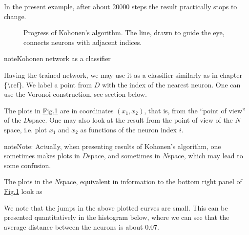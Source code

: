 \documentclass[letterpaper,10pt,english]{jupyterBook}
\let\sphinxpxdimen\pdfpxdimen\else\newdimen\sphinxpxdimen
\begin{document}
\sphinxAtStartPar
In the present example, after about 20000 steps the result practically stops to change.

\begin{figure}[htbp]
\centering
\capstart

\noindent\sphinxincludegraphics[width=800\sphinxpxdimen]{{kaall}.png}
\caption{Progress of Kohonen’s algorithm. The line, drawn to guide the eye, connects neurons with adjacent indices.}\label{\detokenize{docs/som:kohstory-fig}}\end{figure}

\begin{sphinxadmonition}{note}{Kohonen network as a classifier}

\sphinxAtStartPar
Having the trained network, we may use it as a classifier similarly as in chapter \{\textbackslash{}ref\}. We label a point from \(D\) with the index of the nearest neuron. One can use the Voronoi construction, see section {\hyperref[\detokenize{docs/unsupervised:vor-lab}]{}} below.
\end{sphinxadmonition}

\sphinxAtStartPar
The plots in \hyperref[\detokenize{docs/som:kohstory-fig}]{Fig.\@ \ref{\detokenize{docs/som:kohstory-fig}}} are in coordinates \((x_1,x_2)\), that is, from the “point of view” of the \(D\)\sphinxhyphen{}space. One may also look at the result from the point of view of the \(N\)\sphinxhyphen{}space, i.e. plot \(x_1\) and \(x_2\) as functions of the neuron index \(i\).

\begin{sphinxadmonition}{note}{Note:}
\sphinxAtStartPar
Actually, when presenting results of Kohonen’s algorithm, one sometimes makes plots in \(D\)\sphinxhyphen{}space, and sometimes in \(N\)\sphinxhyphen{}space, which may lead to some confusion.
\end{sphinxadmonition}

\sphinxAtStartPar
The plots in the \(N\)\sphinxhyphen{}space, equivalent in information to the bottom right panel of \hyperref[\detokenize{docs/som:kohstory-fig}]{Fig.\@ \ref{\detokenize{docs/som:kohstory-fig}}} look as

\noindent{}

\sphinxAtStartPar
We note that the jumps in the above plotted curves are small. This can be presented quantitatively in the histogram below, where we can see that the average distance between the neurons is about 0.07.
\end{document}
